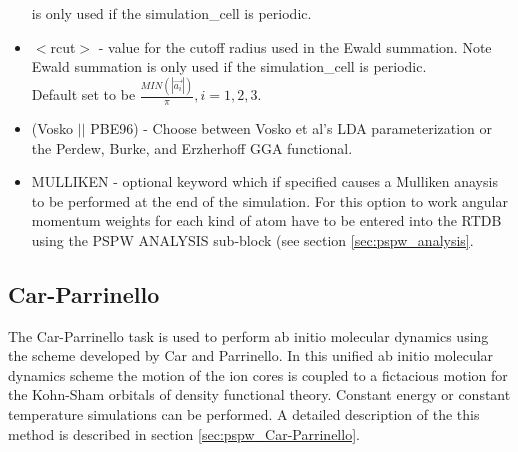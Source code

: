 \begin{itemize}
                          is only used if the simulation\_cell is periodic.
        \item $<$rcut$>$ - value for the cutoff radius used
                          in the Ewald summation. Note Ewald summation
                          is only used if the simulation\_cell is periodic. \\
                           Default set to be
                          $\frac{MIN(\left| \vec{a_i} \right|)}{\pi}, i=1,2,3$.
        \item (Vosko $||$ PBE96) - Choose between Vosko et al's LDA 
                               parameterization or the Perdew, Burke, 
                               and Erzherhoff GGA functional.
        \item MULLIKEN - optional keyword which if specified
                         causes a Mulliken anaysis to be performed at
                         the end of the simulation.  For this option
                         to work angular momentum weights for each kind
                         of atom have to be entered into the RTDB using
                         the PSPW ANALYSIS sub-block (see section \ref{sec:pspw_analysis}.
\end{itemize}





\subsection{Car-Parrinello}
The Car-Parrinello task is used to perform ab initio molecular dynamics
using the scheme developed by Car and Parrinello.  In this unified ab
initio molecular dynamics scheme the motion of the ion cores is coupled to
a fictacious motion for the Kohn-Sham orbitals of density functional
theory.  Constant energy or constant temperature simulations can be
performed.  A detailed description of the this method
is described in section \ref{sec:pspw_Car-Parrinello}.


